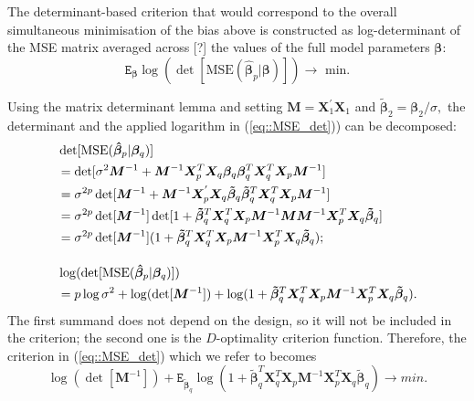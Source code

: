 The determinant-based criterion that would correspond to the overall simultaneous minimisation of the bias above is constructed as log-determinant of the MSE matrix averaged across [?] the values of the full model parameters $\bm{\beta}$:
\begin{equation}
\label{eq::MSE_det}
\mathtt{E}_{\bm{\beta}}\log(\det[\mbox{MSE}(\bm{\hat{\beta}}_p|\bm{\beta})]) \longrightarrow \mbox{ min.}
\end{equation}

Using the matrix determinant lemma \citep{Harville2006matrix} and setting $\bm{M}=\bm{X}_1^{'}\bm{X}_1$ and $\bm{\tilde{\beta}}_2=\bm{\beta}_2/\sigma,$ the determinant and the applied logarithm in (\ref{eq::MSE_det})) can be decomposed:
\begin{align}
\label{eq::mse_det_dec}
&\det[\mbox{MSE}(\bm{\hat{\beta}}_p|\bm{\beta}_q)]\notag\\&=\det[\sigma^2\bm{M}^{-1}+\bm{M}^{-1}\bm{X}_p^{T}\bm{X}_q\bm{\beta}_q\bm{\beta}_q^T\bm{X}_q^{T}\bm{X}_p\bm{M}^{-1}]\notag\\&=\sigma^{2p}\det[\bm{M}^{-1}+\bm{M}^{-1}\bm{X}_p^{'}\bm{X}_q\bm{\tilde{\beta}}_q\bm{\tilde{\beta}}_q^T\bm{X}_q^{T}\bm{X}_p\bm{M}^{-1}]\notag\\&=\sigma^{2p}\det[\bm{M}^{-1}]\det[1+\bm{\tilde{\beta}}_q^T\bm{X}_q^{T}\bm{X}_p\bm{M}^{-1}\bm{M}\bm{M}^{-1}\bm{X}_p^{T}\bm{X}_q\bm{\tilde{\beta}}_q]\notag\\&=\sigma^{2p}\det[\bm{M}^{-1}](1+\bm{\tilde{\beta}}_q^T\bm{X}_q^{T}\bm{X}_p\bm{M}^{-1}\bm{X}_p^{T}\bm{X}_q\bm{\tilde{\beta}}_q);\\[10pt]
&\log(\det[\mbox{MSE}(\bm{\hat{\beta}}_p|\bm{\beta}_q)])\notag\\&=p\log\sigma^2+\log(\det[\bm{M}^{-1}])+\log(1+\bm{\tilde{\beta}}_q^T\bm{X}_q^{T}\bm{X}_p\bm{M}^{-1}\bm{X}_p^{T}\bm{X}_q\bm{\tilde{\beta}}_q). 
\end{align}
The first summand does not depend on the design, so it will not be included in the criterion; the second one is the $D$-optimality criterion function. Therefore, the criterion in (\ref{eq::MSE_det}) which we refer to becomes
\begin{equation*}
\log(\det[\bm{M}^{-1}])+\mathtt{E}_{\bm{\tilde{\beta}}_q}\log(1+\bm{\tilde{\beta}}_q^T\bm{X}_q^{T}\bm{X}_p\bm{M}^{-1}\bm{X}_p^{T}\bm{X}_q\bm{\tilde{\beta}}_q) \longrightarrow min.
\end{equation*}
